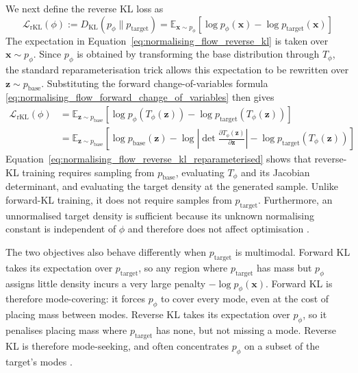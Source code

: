 \documentclass[12pt,a4paper]{report}
\begin{document}
We next define the reverse KL loss as
\begin{equation}
\mathcal{L}_{\mathrm{rKL}}(\phi)
:=
D_{\mathrm{KL}}
\left(
p_{\phi}
\parallel
p_{\mathrm{target}}
\right)
=
\mathbb{E}_{\mathbf{x}\sim p_{\phi}}
\left[
\log p_{\phi}(\mathbf{x})
-
\log p_{\mathrm{target}}(\mathbf{x})
\right]
\label{eq:normalising_flow_reverse_kl}
\end{equation}
The expectation in
Equation~\ref{eq:normalising_flow_reverse_kl} is taken over
$\mathbf{x}\sim p_{\phi}$. Since $p_{\phi}$ is obtained by
transforming the base distribution through $T_{\phi}$, the standard
reparameterisation trick \parencite{pml2Book} allows this expectation
to be rewritten over $\mathbf{z}\sim p_{\mathrm{base}}$. Substituting
the forward change-of-variables formula
\ref{eq:normalising_flow_forward_change_of_variables} then gives
\begin{align}
\mathcal{L}_{\mathrm{rKL}}(\phi)
&=
\mathbb{E}_{\mathbf{z}\sim p_{\mathrm{base}}}
\left[
\log p_{\phi}
\left(
T_{\phi}(\mathbf{z})
\right)
-
\log p_{\mathrm{target}}
\left(
T_{\phi}(\mathbf{z})
\right)
\right]
\nonumber
\\
&=
\mathbb{E}_{\mathbf{z}\sim p_{\mathrm{base}}}
\left[
\log p_{\mathrm{base}}(\mathbf{z})
-
\log
\left|
\det
\frac{
\partial T_{\phi}(\mathbf{z})
}{
\partial \mathbf{z}
}
\right|
-
\log p_{\mathrm{target}}
\left(
T_{\phi}(\mathbf{z})
\right)
\right]
\label{eq:normalising_flow_reverse_kl_reparameterised}
\end{align}
Equation~\ref{eq:normalising_flow_reverse_kl_reparameterised} shows
that reverse-KL training requires sampling from
$p_{\mathrm{base}}$, evaluating $T_{\phi}$ and its Jacobian
determinant, and evaluating the target density at the generated
sample. Unlike forward-KL training, it does not require samples from
$p_{\mathrm{target}}$. Furthermore, an unnormalised target density is
sufficient because its unknown normalising constant is independent of
$\phi$ and therefore does not affect optimisation \parencite{NF_survey}.

The two objectives also behave differently when $p_{\mathrm{target}}$ is multimodal. Forward KL takes its expectation over $p_{\mathrm{target}}$, so any region where $p_{\mathrm{target}}$ has mass but $p_{\phi}$ assigns little density incurs a very large penalty $-\log p_{\phi}(\mathbf{x})$. Forward KL is therefore mode-covering: it forces $p_{\phi}$ to cover every mode, even at the cost of placing mass between modes. Reverse KL takes its expectation over $p_{\phi}$, so it penalises placing mass where $p_{\mathrm{target}}$ has none, but not missing a mode. Reverse KL is therefore mode-seeking, and often concentrates $p_{\phi}$ on a subset of the target's modes \parencite{BG}.
\end{document}
